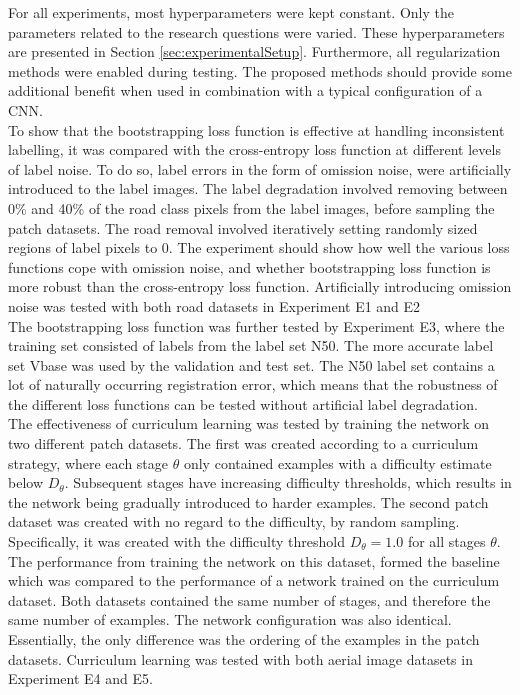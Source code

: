 For all experiments, most hyperparameters were kept constant. Only the parameters related to the research questions were varied. These hyperparameters are presented in Section \ref{sec:experimentalSetup}. Furthermore, all regularization methods were enabled during testing. The proposed methods should provide some additional benefit when used in combination with a typical configuration of a \ac{CNN}.\\

To show that the bootstrapping loss function is effective at handling inconsistent labelling, it was compared with the cross-entropy loss function at different levels of label noise. To do so, label errors in the form of omission noise, were artificially introduced to the label images. The label degradation involved removing between 0\% and 40\% of the road class pixels from the label images, before sampling the patch datasets. The road removal involved iteratively setting randomly sized regions of label pixels to 0. The experiment should show how well the various loss functions cope with omission noise, and whether bootstrapping loss function is more robust than the cross-entropy loss function. Artificially introducing omission noise was tested with both road datasets in Experiment E1 and E2\\

The bootstrapping loss function was further tested by Experiment E3, where the training set consisted of labels from the label set N50. The more accurate label set Vbase was used by the validation and test set. The N50 label set contains a lot of naturally occurring registration error, which means that the robustness of the different loss functions can be tested without artificial label degradation.\\

The effectiveness of curriculum learning was tested by training the network on two different patch datasets. The first was created according to a curriculum strategy, where each stage $\theta$ only contained examples with a difficulty estimate below $D_\theta$. Subsequent stages have increasing difficulty thresholds, which results in the network being gradually introduced to harder examples. The second patch dataset was created with no regard to the difficulty, by random sampling. Specifically, it was created with the difficulty threshold $D_\theta =1.0$ for all stages $\theta$. The performance from training the network on this dataset, formed the baseline which was compared to the performance of a network trained on the curriculum dataset. Both datasets contained the same number of stages, and therefore the same number of examples. The network configuration was also identical. Essentially, the only difference was the ordering of the examples in the patch datasets. Curriculum learning was tested with both aerial image datasets in Experiment E4 and E5.\\

